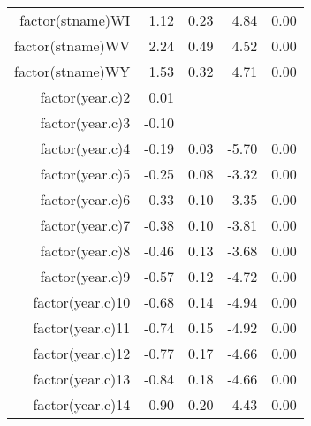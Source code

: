 \begin{table}[ht]
\begin{tabular}{rrrrr}
  factor(stname)WI & 1.12 & 0.23 & 4.84 & 0.00 \\ 
  factor(stname)WV & 2.24 & 0.49 & 4.52 & 0.00 \\ 
  factor(stname)WY & 1.53 & 0.32 & 4.71 & 0.00 \\ 
  factor(year.c)2 & 0.01 &  &  &  \\ 
  factor(year.c)3 & -0.10 &  &  &  \\ 
  factor(year.c)4 & -0.19 & 0.03 & -5.70 & 0.00 \\ 
  factor(year.c)5 & -0.25 & 0.08 & -3.32 & 0.00 \\ 
  factor(year.c)6 & -0.33 & 0.10 & -3.35 & 0.00 \\ 
  factor(year.c)7 & -0.38 & 0.10 & -3.81 & 0.00 \\ 
  factor(year.c)8 & -0.46 & 0.13 & -3.68 & 0.00 \\ 
  factor(year.c)9 & -0.57 & 0.12 & -4.72 & 0.00 \\ 
  factor(year.c)10 & -0.68 & 0.14 & -4.94 & 0.00 \\ 
  factor(year.c)11 & -0.74 & 0.15 & -4.92 & 0.00 \\ 
  factor(year.c)12 & -0.77 & 0.17 & -4.66 & 0.00 \\ 
  factor(year.c)13 & -0.84 & 0.18 & -4.66 & 0.00 \\ 
  factor(year.c)14 & -0.90 & 0.20 & -4.43 & 0.00 \\ 
   \hline
\end{tabular}
\end{table}
